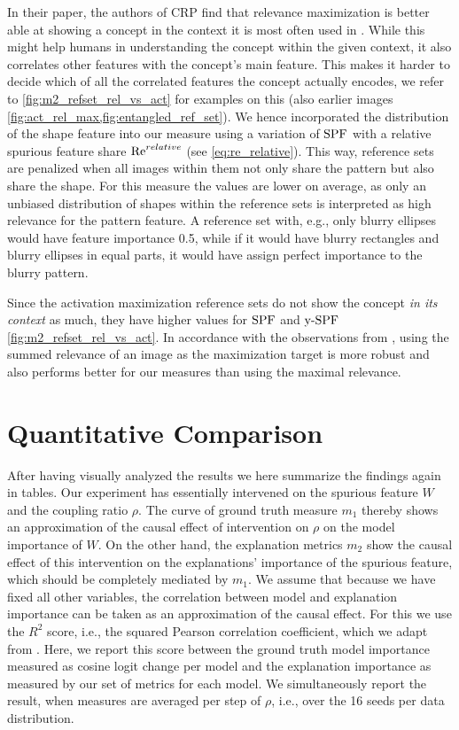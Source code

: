 In their paper, the authors of CRP find that relevance maximization is better able at showing a concept in the context it is most often used in \citep{Achtibat2022}.
While this might help humans in understanding the concept within the given context, it also correlates other features with the concept's main feature. This makes it harder to decide which of all the correlated features the concept actually encodes, we refer to \cref{fig:m2_refset_rel_vs_act} for examples on this (also earlier images \cref{fig:act_rel_max,fig:entangled_ref_set}).
We hence incorporated the distribution of the shape feature into our measure using a variation of $\operatorname*{SPF}$ with a relative spurious feature share $\operatorname*{Re}^{relative}$ (see \cref{eq:re_relative}).
This way, reference sets are penalized when all images within them not only share the pattern but also share the shape. 
For this measure the values are lower on average, as only an unbiased distribution of shapes within the reference sets is interpreted as high relevance for the pattern feature. A reference set with, e.g., only blurry ellipses would have feature importance 0.5, while if it would have blurry rectangles and blurry ellipses in equal parts, it would have assign perfect importance to the blurry pattern. 

Since the activation maximization reference sets do not show the concept \textit{in its context} as much, they have higher values for $\operatorname*{SPF}$ and $\operatorname*{y-SPF}$ \cref{fig:m2_refset_rel_vs_act}. 
In accordance with the observations from \cite{Achtibat2022}, using the summed relevance of an image as the maximization target is more robust and also performs better for our measures than using the maximal relevance. 

\section{Quantitative Comparison}
After having visually analyzed the results we here summarize the findings again in tables. Our experiment has essentially intervened on the spurious feature $W$ and the coupling ratio $\rho$. The curve of ground truth measure $m_1$ thereby shows an approximation of the causal effect of intervention on $\rho$ on the model importance of $W$. On the other hand, the explanation metrics $m_2$ show the causal effect of this intervention on the explanations' importance of the spurious feature, which should be completely mediated by $m_1$. 
We assume that because we have fixed all other variables, the correlation between model and explanation importance can be taken as an approximation of the causal effect.
For this we use the $R^2$ score, i.e., the squared Pearson correlation coefficient, which we adapt from \citet{Sixt2022a}. Here, we report this score between the ground truth model importance measured as cosine logit change per model and the explanation importance as measured by our set of metrics for each model. We simultaneously report the result, when measures are averaged per step of $\rho$, i.e., over the 16 seeds per data distribution. 

